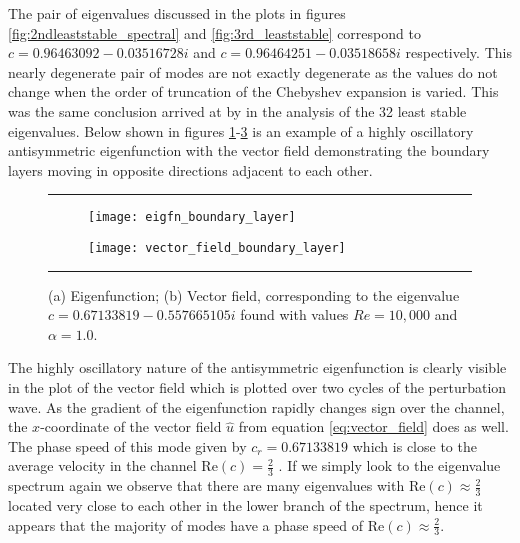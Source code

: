 \documentclass[a4paper, 12pt, twoside, openright]{article}
\numberwithin{equation}{section}
\begin{document}
The pair of eigenvalues discussed in the plots in figures \ref{fig:2ndleaststable_spectral} and \ref{fig:3rd_leaststable} correspond to $c =  0.96463092 - 0.03516728i$ and $c = 0.96464251 - 0.03518658i$ respectively. This nearly degenerate pair of modes are not exactly degenerate as the values do not change when the order of truncation of the Chebyshev expansion is varied. This was the same conclusion arrived at by \cite{Orszag71} in the analysis of the 32 least stable eigenvalues. Below shown in figures \ref{fig:eigfn_boundary_layer}-\ref{fig:vector_field_boundary_layer} is an example of a highly oscillatory antisymmetric eigenfunction with the vector field demonstrating the boundary layers moving in opposite directions adjacent to each other. %
\begin{figure}[ht]
\begin{center}
\rule{\linewidth}{1.5pt}
\end{center}
\centering
\begin{subfigure}{0.5\textwidth}
\texttt{[image: eigfn\_boundary\_layer]}\hfill
\caption{\label{fig:eigfn_boundary_layer}}
\end{subfigure}
\begin{subfigure}{1.0\textwidth}
\texttt{[image: vector\_field\_boundary\_layer]}\hfill
\caption{\label{fig:vector_field_boundary_layer}}
\end{subfigure}
\caption{(a) Eigenfunction; (b) Vector field, corresponding to the eigenvalue $c=0.67133819 - 0.557665105i$ found with values $Re=10,000$ and $\alpha=1.0$.}
\rule{\linewidth}{1.5pt}
\end{figure}
The highly oscillatory nature of the antisymmetric eigenfunction is clearly visible in the plot of the vector field which is plotted over two cycles of the perturbation wave. As the gradient of the eigenfunction rapidly changes sign over the channel, the $x$-coordinate of the vector field $\hat u$ from equation \eqref{eq:vector_field} does as well. The phase speed of this mode given by $c_r = 0.67133819$ which is close to the average velocity in the channel $\mathrm{Re}(c)=\frac{2}{3}$ \cite{Orszag71}. If we simply look to the eigenvalue spectrum again we observe that there are many eigenvalues with $\mathrm{Re}(c)\approx\frac{2}{3}$ located very close to each other in the lower branch of the spectrum, hence it appears that the majority of modes have a phase speed of $\mathrm{Re}(c)\approx\frac{2}{3}$.%
\end{document}
